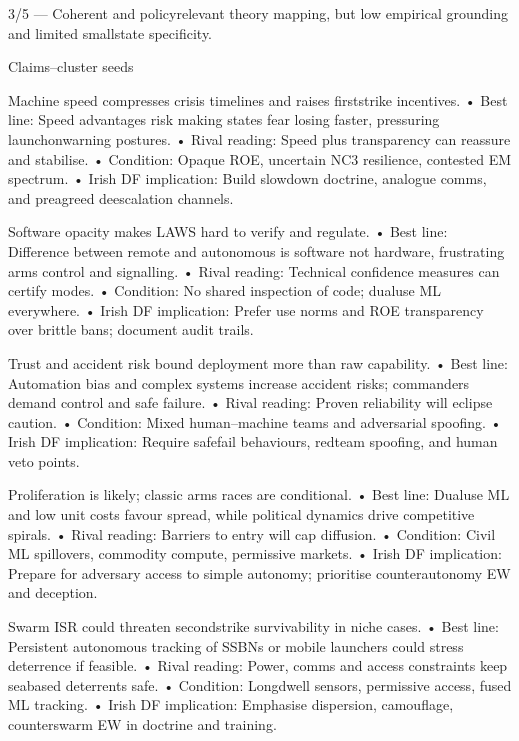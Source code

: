 3/5 — Coherent and policy\textendash relevant theory mapping, but low empirical grounding and limited small\textendash state specificity.

Claims–cluster seeds

Machine speed compresses crisis timelines and raises first\textendash strike incentives.
• Best line: Speed advantages risk making states fear losing faster, pressuring launch\textendash on\textendash warning postures.
• Rival reading: Speed plus transparency can reassure and stabilise.
• Condition: Opaque ROE, uncertain NC3 resilience, contested EM spectrum.
• Irish DF implication: Build slow\textendash down doctrine, analogue comms, and pre\textendash agreed de\textendash escalation channels.

Software opacity makes LAWS hard to verify and regulate.
• Best line: Difference between remote and autonomous is software not hardware, frustrating arms control and signalling.
• Rival reading: Technical confidence measures can certify modes.
• Condition: No shared inspection of code; dual\textendash use ML everywhere.
• Irish DF implication: Prefer use norms and ROE transparency over brittle bans; document audit trails.

Trust and accident risk bound deployment more than raw capability.
• Best line: Automation bias and complex systems increase accident risks; commanders demand control and safe failure.
• Rival reading: Proven reliability will eclipse caution.
• Condition: Mixed human–machine teams and adversarial spoofing.
• Irish DF implication: Require safe\textendash fail behaviours, red\textendash team spoofing, and human veto points.

Proliferation is likely; classic arms races are conditional.
• Best line: Dual\textendash use ML and low unit costs favour spread, while political dynamics drive competitive spirals.
• Rival reading: Barriers to entry will cap diffusion.
• Condition: Civil ML spillovers, commodity compute, permissive markets.
• Irish DF implication: Prepare for adversary access to simple autonomy; prioritise counter\textendash autonomy EW and deception.

Swarm ISR could threaten second\textendash strike survivability in niche cases.
• Best line: Persistent autonomous tracking of SSBNs or mobile launchers could stress deterrence if feasible.
• Rival reading: Power, comms and access constraints keep sea\textendash based deterrents safe.
• Condition: Long\textendash dwell sensors, permissive access, fused ML tracking.
• Irish DF implication: Emphasise dispersion, camouflage, counter\textendash swarm EW in doctrine and training.

